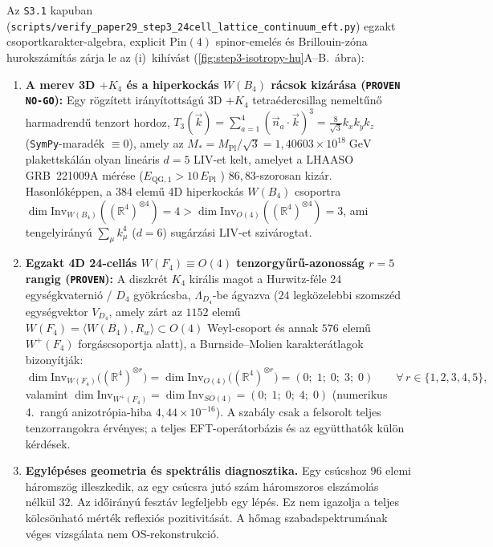 \documentclass[11pt,a4paper]{article}
\begin{document}
Az \texttt{S3.1} kapuban (\texttt{scripts/\allowbreak verify\_\allowbreak paper29\_\allowbreak step3\_\allowbreak 24cell\_\allowbreak lattice\_\allowbreak continuum\_\allowbreak eft.py}) egzakt csoportkarakter-algebra, explicit $\mathrm{Pin}(4)$ spinor-emelés és Brillouin-zóna hurokszámítás zárja le az (i)~kihívást (\ref{fig:step3-isotropy-hu}A--B.~ábra):
\begin{enumerate}
    \item \textbf{A merev 3D $+K_4$ és a hiperkockás $W(B_4)$ rácsok kizárása (\texttt{PROVEN NO-GO}):} Egy rögzített irányítottságú 3D $+K_4$ tetraédercsillag nemeltűnő harmadrendű tenzort hordoz, $T_3(\vec{k}) = \sum_{a=1}^4 (\vec{n}_a\cdot\vec{k})^3 = \frac{8}{\sqrt{3}}k_x k_y k_z$ (\texttt{SymPy}-maradék $\equiv 0$), amely az $M_* = M_{\mathrm{Pl}}/\sqrt{3} = 1{,}40603\times 10^{18}\;\mathrm{GeV}$ plakettskálán olyan lineáris $d = 5$ LIV-et kelt, amelyet a LHAASO GRB~221009A mérése ($E_{\mathrm{QG},1} > 10\,E_{\mathrm{Pl}}$ \cite{LHAASO2023}) $86{,}83$-szorosan kizár. Hasonlóképpen, a $384$ elemű 4D hiperkockás $W(B_4)$ csoportra $\dim\mathrm{Inv}_{W(B_4)}((\mathbb{R}^4)^{\otimes 4}) = 4 > \dim\mathrm{Inv}_{O(4)}((\mathbb{R}^4)^{\otimes 4}) = 3$, ami tengelyirányú $\sum_\mu k_\mu^4$ ($d = 6$) sugárzási LIV-et szivárogtat.
    \item \textbf{Egzakt 4D 24-cellás $W(F_4) \equiv O(4)$ tenzorgyűrű-azonosság $r = 5$ rangig (\texttt{PROVEN}):} A diszkrét $K_4$ királis magot a Hurwitz-féle 24 egységkvaternió / $D_4$ gyökrácsba, $\Lambda_{D_4}$-be ágyazva ($24$ legközelebbi szomszéd egységvektor $V_{D_4}$, amely zárt az $1152$ elemű $W(F_4) = \langle W(B_4), R_w\rangle \subset O(4)$ Weyl-csoport és annak $576$ elemű $W^+(F_4)$ forgáscsoportja alatt), a Burnside--Molien karakterátlagok bizonyítják:
    \begin{equation}
        \dim\mathrm{Inv}_{W(F_4)}\bigl((\mathbb{R}^4)^{\otimes r}\bigr) = \dim\mathrm{Inv}_{O(4)}\bigl((\mathbb{R}^4)^{\otimes r}\bigr) = (0;\; 1;\; 0;\; 3;\; 0) \qquad \forall\, r \in \{1, 2, 3, 4, 5\},
        \label{eq:wf4-isotropy-hu}
    \end{equation}
    valamint $\dim\mathrm{Inv}_{W^+(F_4)} = \dim\mathrm{Inv}_{SO(4)} = (0;\; 1;\; 0;\; 4;\; 0)$ (numerikus 4.~rangú anizotrópia-hiba $4{,}44\times 10^{-16}$). A szabály csak a felsorolt teljes tenzorrangokra érvényes; a teljes EFT-operátorbázis és az együtthatók külön kérdések.
    \item \textbf{Egylépéses geometria és spektrális diagnosztika.} Egy csúcshoz $96$ elemi háromszög illeszkedik, az egy csúcsra jutó szám háromszoros elszámolás nélkül $32$. Az időirányú fesztáv legfeljebb egy lépés. Ez nem igazolja a teljes kölcsönható mérték reflexiós pozitivitását. A hőmag szabadspektrumának véges vizsgálata nem OS-rekonstrukció.
\end{enumerate}
\end{document}
